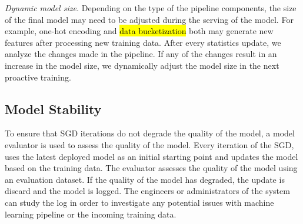 \textit{Dynamic model size.}
Depending on the type of the pipeline components, the size of the final model may need to be adjusted during the serving of the model.
For example, one-hot encoding and \hl{data bucketization} both may generate new features after processing new training data.
After every statistics update, we analyze the changes made in the pipeline.
If any of the changes result in an increase in the model size, we dynamically adjust the model size in the next proactive training. 

\subsection{Model Stability}

To ensure that SGD iterations do not degrade the quality of the model, a model evaluator is used to assess the quality of the model.
Every iteration of the SGD, uses the latest deployed model as an initial starting point and updates the model based on the training data.
The evaluator assesses the quality of the model using an evaluation dataset.
If the quality of the model has degraded, the update is discard and the model is logged.
The engineers or administrators of the system can study the log in order to investigate any potential issues with machine learning pipeline or the incoming training data.

